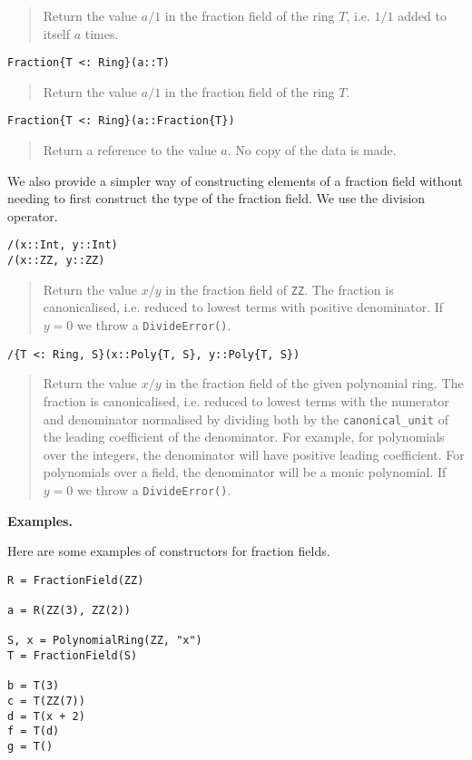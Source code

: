 \documentclass[a4paper,10pt]{article}
\newcommand{\code}{\lstinline}
\newcommand{\desc}[1]{\vspace{-3mm}\begin{quote}#1\end{quote}}
\begin{document}
{{{\desc{Return the value $a/1$ in the fraction field of the ring $T$, i.e.
$1/1$ added to itself $a$ times.}

\begin{lstlisting}
Fraction{T <: Ring}(a::T)
\end{lstlisting}

\desc{Return the value $a/1$ in the fraction field of the ring $T$.}

\begin{lstlisting}
Fraction{T <: Ring}(a::Fraction{T})
\end{lstlisting}

\desc{Return a reference to the value $a$. No copy of the data is made.}

We also provide a simpler way of constructing elements of a fraction field
without needing to first construct the type of the fraction field. We use
the division operator.

\begin{lstlisting}
/(x::Int, y::Int)
/(x::ZZ, y::ZZ)
\end{lstlisting}

\desc{Return the value $x/y$ in the fraction field of \code{ZZ}. The fraction
is canonicalised, i.e. reduced to lowest terms with positive denominator. If
$y = 0$ we throw a \code{DivideError()}.}

\begin{lstlisting}
/{T <: Ring, S}(x::Poly{T, S}, y::Poly{T, S})
\end{lstlisting}

\desc{Return the value $x/y$ in the fraction field of the given polynomial
ring. The fraction is canonicalised, i.e. reduced to lowest terms with the
numerator and denominator normalised by dividing both by the
\code{canonical_unit} of the leading coefficient of the denominator. For
example, for polynomials over the integers, the denominator will have
positive leading coefficient. For polynomials over a field, the denominator
will be a monic polynomial. If $y = 0$ we throw a \code{DivideError()}.}

\textbf{Examples.}

Here are some examples of constructors for fraction fields.

\begin{lstlisting}
R = FractionField(ZZ)

a = R(ZZ(3), ZZ(2))

S, x = PolynomialRing(ZZ, "x")
T = FractionField(S)

b = T(3)
c = T(ZZ(7))
d = T(x + 2)
f = T(d)
g = T()


\end{lstlisting}}}}
\end{document}
